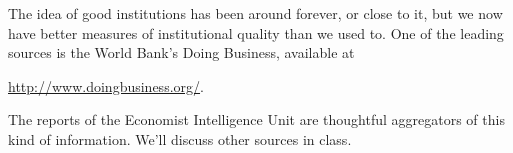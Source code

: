 The idea of good institutions has been around forever, or close to it,
but we now have better measures of institutional quality than we used to.
One of the leading sources is the World Bank's Doing Business, available at

\vspace*{\parskip}
\centerline{\url{http://www.doingbusiness.org/}.}

The reports of the Economist Intelligence Unit are thoughtful aggregators
of this kind of information.
We'll discuss other sources in class.
